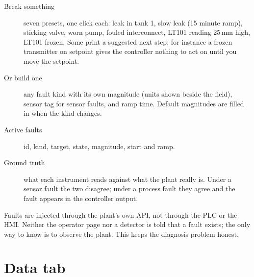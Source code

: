 \begin{description}
  \item[Break something] seven presets, one click each: leak in tank 1, slow
        leak (15 minute ramp), sticking valve, worn pump, fouled interconnect,
        LT101 reading 25\,mm high, LT101 frozen. Some print a suggested next
        step; for instance a frozen transmitter on setpoint gives the
        controller nothing to act on until you move the setpoint.
  \item[Or build one] any fault kind with its own magnitude (units shown
        beside the field), sensor tag for sensor faults, and ramp time.
        Default magnitudes are filled in when the kind changes.
  \item[Active faults] id, kind, target, state, magnitude, start and ramp.
  \item[Ground truth] what each instrument reads against what the plant
        really is. Under a sensor fault the two disagree; under a process
        fault they agree and the fault appears in the controller output.
\end{description}

\begin{note}
Faults are injected through the plant's own API, not through the PLC or the
HMI. Neither the operator page nor a detector is told that a fault exists;
the only way to know is to observe the plant. This keeps the diagnosis problem
honest.
\end{note}

\section{Data tab}

